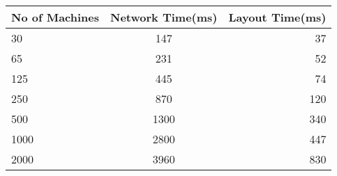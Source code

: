 \begin{appendices}
\begin{table}[h!]
\label{tab:availabledata}
\begin{tabular}{l|c||r}
No of Machines & Network Time(ms)& Layout Time(ms)\\
\hline
30&147&37 \\
65&231&52 \\
125&445&74 \\
250&870&120 \\
500&1300&340 \\
1000&2800&447 \\
2000&3960&830 \\ 
\end{tabular}
\end{table}
\end{appendices}